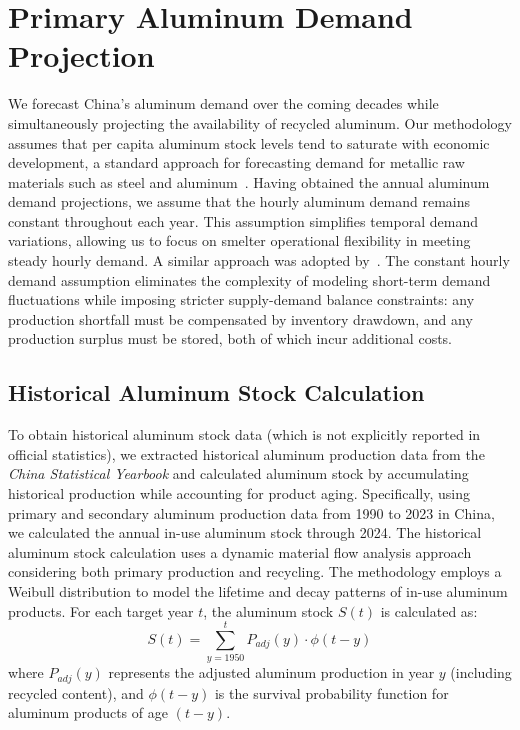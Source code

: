 \documentclass[preprint,12pt]{elsarticle}
\begin{document}
\newpage

\section{Primary Aluminum Demand Projection}

We forecast China's aluminum demand over the coming decades while simultaneously projecting the availability of recycled aluminum. Our methodology assumes that per capita aluminum stock levels tend to saturate with economic development, a standard approach for forecasting demand for metallic raw materials such as steel and aluminum~\citep{song_mapping_2020, li_analysis_2022}. Having obtained the annual aluminum demand projections, we assume that the hourly aluminum demand remains constant throughout each year. This assumption simplifies temporal demand variations, allowing us to focus on smelter operational flexibility in meeting steady hourly demand. A similar approach was adopted by~\citet{livalue}. The constant hourly demand assumption eliminates the complexity of modeling short-term demand fluctuations while imposing stricter supply-demand balance constraints: any production shortfall must be compensated by inventory drawdown, and any production surplus must be stored, both of which incur additional costs.

\subsection{Historical Aluminum Stock Calculation}

To obtain historical aluminum stock data (which is not explicitly reported in official statistics), we extracted historical aluminum production data from the \textit{China Statistical Yearbook} and calculated aluminum stock by accumulating historical production while accounting for product aging. Specifically, using primary and secondary aluminum production data from 1990 to 2023 in China, we calculated the annual in-use aluminum stock through 2024. The historical aluminum stock calculation uses a dynamic material flow analysis approach considering both primary production and recycling. The methodology employs a Weibull distribution to model the lifetime and decay patterns of in-use aluminum products. For each target year $t$, the aluminum stock $S(t)$ is calculated as:
\begin{equation}
S(t) = \sum_{y=1950}^{t} P_{adj}(y) \cdot \phi(t-y)
\end{equation}
where $P_{adj}(y)$ represents the adjusted aluminum production in year $y$ (including recycled content), and $\phi(t-y)$ is the survival probability function for aluminum products of age $(t-y)$.
\end{document}
